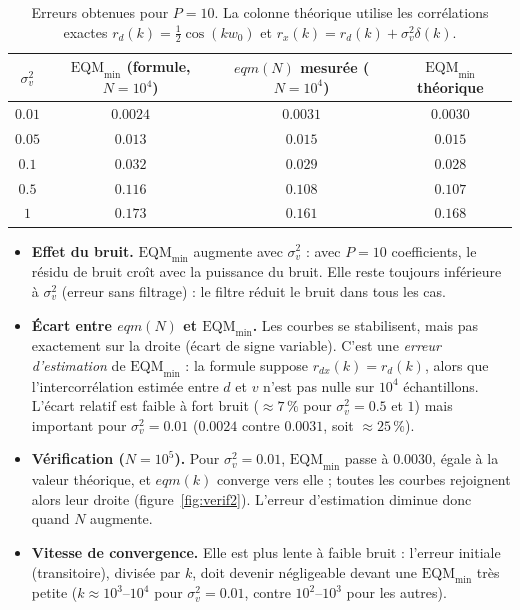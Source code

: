 \begin{table}[H]
  \centering
  \begin{tabular}{cccc}
    \toprule
    $\sigma_v^2$ & $\mathrm{EQM}_{\min}$ (formule, $N=10^4$) & $eqm(N)$ mesurée ($N=10^4$) & $\mathrm{EQM}_{\min}$ théorique \\
    \midrule
    $0.01$ & $0.0024$ & $0.0031$ & $0.0030$ \\
    $0.05$ & $0.013$  & $0.015$  & $0.015$ \\
    $0.1$  & $0.032$  & $0.029$  & $0.028$ \\
    $0.5$  & $0.116$  & $0.108$  & $0.107$ \\
    $1$    & $0.173$  & $0.161$  & $0.168$ \\
    \bottomrule
  \end{tabular}
  \caption{Erreurs obtenues pour $P=10$. La colonne théorique utilise les corrélations exactes $r_d(k)=\tfrac12\cos(kw_0)$ et $r_x(k)=r_d(k)+\sigma_v^2\delta(k)$.}
\end{table}

\begin{interpretation}
\begin{itemize}
  \item \textbf{Effet du bruit.} $\mathrm{EQM}_{\min}$ augmente avec $\sigma_v^2$ : avec $P=10$ coefficients, le résidu de bruit croît avec la puissance du bruit. Elle reste toujours inférieure à $\sigma_v^2$ (erreur sans filtrage) : le filtre réduit le bruit dans tous les cas.
  \item \textbf{Écart entre $eqm(N)$ et $\mathrm{EQM}_{\min}$.} Les courbes se stabilisent, mais pas exactement sur la droite (écart de signe variable). C'est une \emph{erreur d'estimation} de $\mathrm{EQM}_{\min}$ : la formule suppose $r_{dx}(k)=r_d(k)$, alors que l'intercorrélation estimée entre $d$ et $v$ n'est pas nulle sur $10^4$ échantillons. L'écart relatif est faible à fort bruit ($\approx 7\,\%$ pour $\sigma_v^2=0.5$ et $1$) mais important pour $\sigma_v^2=0.01$ ($0.0024$ contre $0.0031$, soit $\approx 25\,\%$).
  \item \textbf{Vérification ($N=10^5$).} Pour $\sigma_v^2=0.01$, $\mathrm{EQM}_{\min}$ passe à $0.0030$, égale à la valeur théorique, et $eqm(k)$ converge vers elle ; toutes les courbes rejoignent alors leur droite (figure~\ref{fig:verif2}). L'erreur d'estimation diminue donc quand $N$ augmente.
  \item \textbf{Vitesse de convergence.} Elle est plus lente à faible bruit : l'erreur initiale (transitoire), divisée par $k$, doit devenir négligeable devant une $\mathrm{EQM}_{\min}$ très petite ($k\approx 10^3$--$10^4$ pour $\sigma_v^2=0.01$, contre $10^2$--$10^3$ pour les autres).
\end{itemize}
\end{interpretation}

